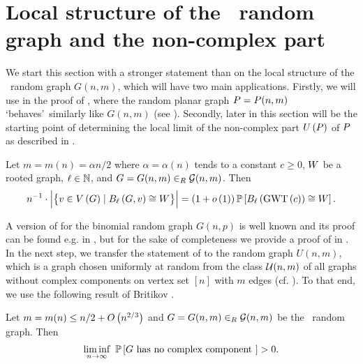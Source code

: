 \section[Local structure of the \ER\ random graph and non-complex part]{Local structure of the \ER\ random graph and the non-complex part}\label{LSsec:local_er_non_complex}
We start this section with a stronger statement than  on the local structure of the \ER\ random graph $G(n,m)$, which will have two main applications. Firstly, we will use  in the proof of , where the random planar graph $P=P(n,m)$ \lq behaves\rq\ similarly like $G(n,m)$ (see ). Secondly, later in this section  will be the starting point of determining the local limit of the non-complex part $U\left(P\right)$ of $P$ as described in .
\begin{lem}\label{LSlem:local_er}
Let $m=m(n)=\alpha n/2$ where $\alpha=\alpha(n)$ tends to a constant $c\geq 0$, $W$ be a rooted graph, $\ell\in\mathbb{N}$, and $G=G(n,m)\in_R\mathcal{G}(n,m)$. Then \whp
\begin{align*}
n^{-1}\cdot\Big|\big\{v\in V\left(G\right) \mid B_{\ell}\left(G, v\right)\cong W\big\}\Big|=\left(1+o\left(1\right)\right)\mathbb{P}\left[B_{\ell}\left(\operatorname{GWT}\left(c\right)\right)\cong W\right].
\end{align*}
\end{lem}

A version of  for the binomial random graph $G(n,p)$ is well known and its proof can be found e.g. in {\cite[Chapter 2]{vanderHofstadAppear}}, but for the sake of completeness we provide a proof of  in . In the next step, we transfer the statement of  to the random graph $U(n,m)$, which is a graph chosen uniformly at random from the class $\mathcal{U}(n,m)$ of all graphs without complex components on vertex set $[n]$ with $m$ edges (cf. ). To that end, we use the following result of Britikov \cite{Britikov1989}.

\begin{thm}\label{LSthm:non_complex}
	Let $m=m(n)\leq n/2+O\left(n^{2/3}\right)$ and $G=G(n,m)\in_R \mathcal{G}(n,m)$ be the \ER\ random graph. Then 
	\begin{align*}
		\liminf_{n \to \infty}~ \mathbb{P}\left[G \text{ has no complex component }\right]>0.
	\end{align*}
\end{thm}

